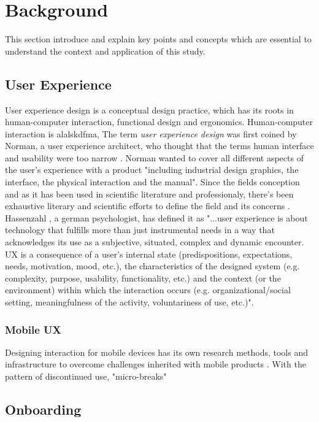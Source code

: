 \chapter{Background}
\label{chap:background}
This section introduce and explain key points and concepts which are essential to understand the context and application of this study.

\section{User Experience}
User experience design is a conceptual design practice, which has its roots in human-computer interaction, functional design and ergonomics. Human-computer interaction is alalskdfma, The term \textit{user experience design} was first coined by Norman, a user experience architect, who thought that the terms human interface and usability were too narrow \cite{Merholz2008}. Norman wanted to cover all different aspects of the user's experience with a product "including industrial design graphics, the interface, the physical interaction and the manual". Since the fields conception and as it has been used in scientific literature and professionaly, there's been exhaustive literary and scientific efforts to define the field and its concerns \cite{Law2008} \cite{Law2009} \cite{Forlizzi2000}. Hassenzahl \cite{Hassenzahl2006}, a german psychologist, has defined it as "...user experience is about technology that fulfills more than just instrumental needs in a way that acknowledges its use as a subjective, situated, complex and dynamic encounter. UX is a consequence of a user’s internal state (predispositions, expectations, needs, motivation, mood, etc.), the characteristics of the designed system (e.g. complexity, purpose, usability, functionality, etc.) and the context (or the environment) within which the interaction occurs (e.g. organizational/social setting, meaningfulness of the activity, voluntariness of use, etc.)".

\subsection{Mobile UX}
Designing interaction for mobile devices has its own research methods, tools and infrastructure to overcome challenges inherited with mobile products \cite{Nakhimovsky2009}. With the pattern of discontinued use, "micro-breaks" \cite{McGregor2014a}
\section{Onboarding}

